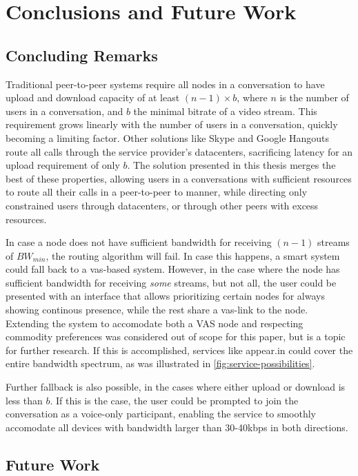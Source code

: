 \chapter{Conclusions and Future Work}\label{chp:conclusions}


\section{Concluding Remarks}\label{sec:conclusions}

Traditional peer-to-peer systems require all nodes in a conversation to have upload and download capacity of at least $(n-1) \times b$, where $n$ is the number of users in a conversation, and $b$ the minimal bitrate of a video stream. This requirement grows linearly with the number of users in a conversation, quickly becoming a limiting factor. Other solutions like Skype and Google Hangouts route all calls through the service provider's datacenters, sacrificing latency for an upload requirement of only $b$. The solution presented in this thesis merges the best of these properties, allowing users in a conversations with sufficient resources to route all their calls in a peer-to-peer to manner, while directing only constrained users through datacenters, or through other peers with excess resources.

In case a node does not have sufficient bandwidth for receiving $(n-1)$ streams of $BW_{min}$, the routing algorithm will fail. In case this happens, a smart system could fall back to a \gls{vas}-based system. However, in the case where the node has sufficient bandwidth for receiving \emph{some} streams, but not all, the user could be presented with an interface that allows prioritizing certain nodes for always showing continous presence, while the rest share a \gls{vas}-link to the node. Extending the system to accomodate both a VAS node and respecting commodity preferences was considered out of scope for this paper, but is a topic for further research. If this is accomplished, services like appear.in could cover the entire bandwidth spectrum, as was illustrated in \autoref{fig:service-possibilities}.

Further fallback is also possible, in the cases where either upload or download is less than $b$. If this is the case, the user could be prompted to join the conversation as a voice-only participant, enabling the service to smoothly accomodate all devices with bandwidth larger than 30-40kbps in both directions.


\section{Future Work}\label{sec:future_work}

